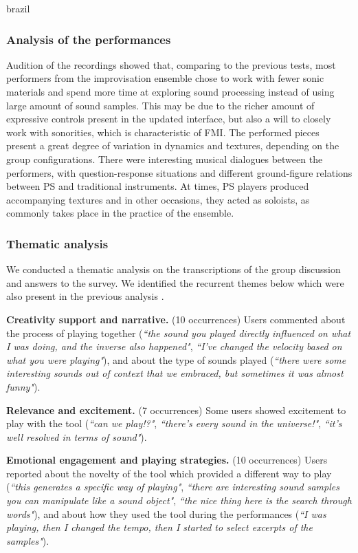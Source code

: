 \begin{otherlanguage*}{brazil}
\subsubsection{Analysis of the performances}

Audition of the recordings showed that, comparing to the previous tests, most performers from the improvisation ensemble chose to work with fewer sonic materials and spend more time at exploring sound processing instead of using large amount of sound samples. This may be due to the richer amount of expressive controls present in the updated interface, but also a will to closely work with sonorities, which is characteristic of FMI. The performed pieces present a great degree of variation in dynamics and textures, depending on the group configurations. There were interesting musical dialogues between the performers, with question-response situations and different ground-figure relations between PS and traditional instruments. At times, PS players produced accompanying textures and in other occasions, they acted as soloists, as commonly takes place in the practice of the ensemble.


\subsubsection{Thematic analysis}

We conducted a thematic analysis \cite{Braun2006} on the transcriptions of the group discussion and answers to the survey. We identified the recurrent themes below which were also present in the previous analysis \cite{Stolfi2018b}.

\textbf{Creativity support and narrative.} (10 occurrences) Users commented about the process of playing together (\textit{``the sound you played directly influenced on what I was doing, and the inverse also happened"}, \textit{``I've changed the velocity based on what you were playing"}), and about the type of sounds played (\textit{``there were some interesting sounds out of context that we embraced, but sometimes it was almost funny"}). 

\textbf{Relevance and excitement.} (7 occurrences) Some users showed excitement to play with the tool (\textit{``can we play!?"}, \textit{``there's every sound in the universe!"}, \textit{``it's well resolved in terms of sound"}).

\textbf{Emotional engagement and playing strategies.} (10 occurrences) Users reported about the novelty of the tool which provided a different way to play (\textit{``this generates a specific way of playing"}, \textit{``there are interesting sound samples you can manipulate like a sound object"}, \textit{``the nice thing here is the search through words"}), and about how they used the tool during the performances (\textit{``I was playing, then I changed the tempo, then I started to select excerpts of the samples"}).


\end{otherlanguage*}
